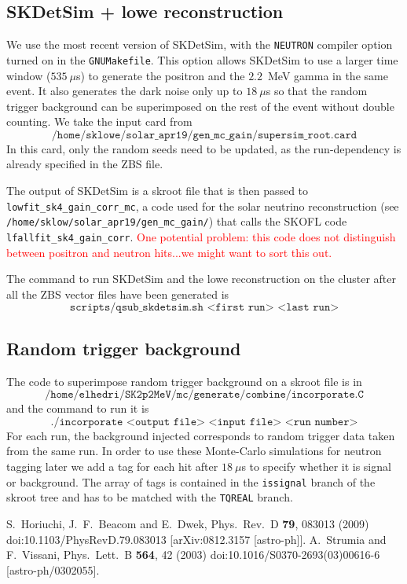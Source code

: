 \documentclass[12pt]{article}
\begin{document}
    \subsection{SKDetSim + lowe reconstruction}
    We use the most recent version of SKDetSim, with the \texttt{NEUTRON} compiler option turned on in the \texttt{GNUMakefile}. This option allows SKDetSim to use a larger time window ($535~\mu$s) to generate the positron and the $2.2$~MeV gamma in the same event. It also generates the dark noise only up to $18~\mu$s so that the random trigger background can be superimposed on the rest of the event without double counting. We take the input card from
        $$\texttt{/home/sklowe/solar\_apr19/gen\_mc\_gain/supersim\_root.card}$$
    In this card, only the random seeds need to be updated, as the run-dependency is already specified in the ZBS file.

    The output of SKDetSim is a skroot file that is then passed to \texttt{lowfit\_sk4\_gain\_corr\_mc}, a code used for the solar neutrino reconstruction (see \texttt{/home/sklow/solar\_apr19/gen\_mc\_gain/}) that calls the SKOFL code \texttt{lfallfit\_sk4\_gain\_corr}. \textcolor{red}{One potential problem: this code does not distinguish between positron and neutron hits...we might want to sort this out.}

    The command to run SKDetSim and the lowe reconstruction on the cluster after all the ZBS vector files have been generated is 
    $$\texttt{scripts/qsub\_skdetsim.sh <first run> <last run>}$$ 
    \subsection{Random trigger background}
    The code to superimpose random trigger background on a skroot file is in
        $$\texttt{/home/elhedri/SK2p2MeV/mc/generate/combine/incorporate.C}$$
    and the command to run it is
        $$\texttt{./incorporate <output file> <input file> <run number>}$$
        For each run, the background injected corresponds to random trigger data taken from the same run. In order to use these Monte-Carlo simulations for neutron tagging later we add a tag for each hit after $18~\mu$s to specify whether it is signal or background. The array of tags is contained in the \texttt{issignal} branch of the skroot tree and has to be matched with the \texttt{TQREAL} branch.
    \begin{thebibliography}{9}
  S.~Horiuchi, J.~F.~Beacom and E.~Dwek,
  Phys.\ Rev.\ D {\bf 79}, 083013 (2009)
  doi:10.1103/PhysRevD.79.083013
  [arXiv:0812.3157 [astro-ph]].
  A.~Strumia and F.~Vissani,
  Phys.\ Lett.\ B {\bf 564}, 42 (2003)
  doi:10.1016/S0370-2693(03)00616-6
  [astro-ph/0302055].
    \end{thebibliography}
\end{document}
